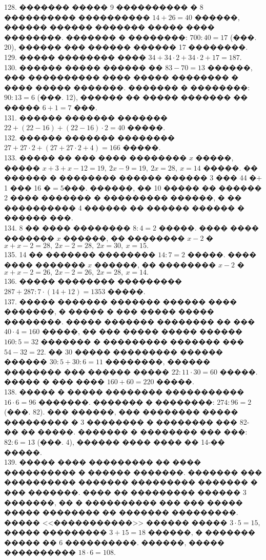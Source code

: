 \documentclass[12pt]{article}
\begin{document}
128. ������� ����� 9 ���������� � 8 ���������� ���������� $14+26=40$ ������, ������ ������ ������� ����� ���� ��������. ������� � ��������: $700:40=17$ (���. 20), ������ ��� ������ ������ 17 ��������.\\
129. ����� �������� ���� $34+34\cdot2+34\cdot2+17=187.$\\
130. ������ ����� ������ �� $83-70=13$ ������, ��� ���������� ���� ����� �������� � ���� ����� �������. ������� � ��������: $90:13=6$ (���. 12), ������ �� ����� ������� �� ����� $6+1=7$ ���.\\
131. ������ ������� ������� $22+(22-16)+(22-16)\cdot2=40$ �����.\\
132. ������ ������� �������� $27+27\cdot2+(27+27\cdot2+4)=166$ �����.\\
133. ����� �� ��� ���� �������� $x$ �����, ����� $x+3+x-12=19,\ 2x-9=19,\ 2x=28,\ x=14$ �����. �� ������ � �������� ������ ������ 3 ��� 44 �$+$1 ��� 16 �$=5$���. ������, �� 10 ����� �� ������ 2 ���� ������� � ��������� ������, � �� ���������� 4 ������ �� ������ ������ � ������ ���.\\
134. 8 �� ���� �������� $8:4=2$ �����. ���� ���� ������� $x$ ������, �� �������� $x-2$ � $x+x-2=28,\ 2x-2=28,\ 2x=30,\ x=15.$\\
135. 14 �� ������� �������� $14:7=2$ �����. ���� ���� ������� $x$ ������, �� �������� $x-2$ � $x+x-2=26,\ 2x-2=26,\ 2x=28,\ x=14.$\\
136. ����� �������� ��������� $287+287:7\cdot(14+12)=1353$ �����.\\
137. ����� ������� ������� ������ ���� �������, � ����� � ��� ����� ����� ��������. ����� ������� �������� �� ��� $40\cdot4=160$ �����, �� ��� ����� ����� ������ $160:5=32$ ������� � ��������� ������� ��� $54-32=22.$ �� 30 ����� ��������� ������ ������ $30:5+30:6=11$ ��������, ������ �������� ��� ������ ����� $22:11\cdot30=60$ �����. ����� � ��� ���� $160+60=220$ �����.\\
138. ����� � ����� �������� ����������� $16\cdot6=96$ �������. ������� � ��������: $274:96=2$ (���. 82). ��� ������, ��� �������� ����� ��������� � 3 �������� � �������� ��� 82-�� �� �����. ������� � �������� ��� ���: $82:6=13$ (���. 4), ������ ���� ���� �� 14-�� �����.\\
139.  ����� ���� ��������� �� ���� ���������� � ������ �������. ������� ��� ���������� ������� ��������� ������� � ��� �������. ���� �� ��������� ������ 3 �������, �� � ���������� ��� ��� ����� ����� �������� �� ������� ���������. ����� <<�����������>> ������ ����� $3\cdot5=15,$ ����� ��������� $3+15=18$ ������, � ������� ����� �� 6 ����������. ������, ����� ���������� $18\cdot6=108.$\\
\end{document}
